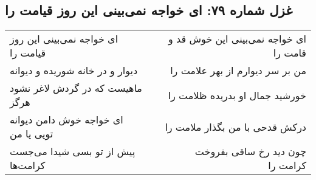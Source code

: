 \begin{center}
\section*{غزل شماره ۷۹: ای خواجه نمی‌بینی این روز قیامت را}
\label{sec:0079}
\begin{longtable}{l p{0.5cm} r}
ای خواجه نمی‌بینی این روز قیامت را
&&
ای خواجه نمی‌بینی این خوش قد و قامت را
\\
دیوار و در خانه شوریده و دیوانه
&&
من بر سر دیوارم از بهر علامت را
\\
ماهیست که در گردش لاغر نشود هرگز
&&
خورشید جمال او بدریده ظلامت را
\\
ای خواجه خوش دامن دیوانه تویی یا من
&&
درکش قدحی با من بگذار ملامت را
\\
پیش از تو بسی شیدا می‌جست کرامت‌ها
&&
چون دید رخ ساقی بفروخت کرامت را
\\
\end{longtable}
\end{center}
